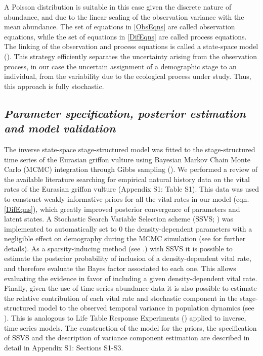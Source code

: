 \documentclass[12pt]{article}
\begin{document}
A Poisson distribution is suitable  in this case given the discrete nature of abundance, and due to the linear scaling of the observation variance with the mean abundance. The set of equations in \ref{ObsEqns} are called observation equations, while the set of equations in \ref{DifEqns} are called process equations. The linking of the observation and process equations is called a state-space model (\cite{King2010}). This strategy efficiently separates the uncertainty arising from the observation process, in our case the uncertain assignment of a demographic stage to an individual, from the variability due to the ecological process under study. Thus, this approach is fully stochastic.

\subsection*{\textit{Parameter specification, posterior estimation and model validation}}

The inverse state-space stage-structured model was fitted to the stage-structured time series of the Eurasian griffon vulture using Bayesian Markov Chain Monte Carlo (MCMC) integration through Gibbs sampling (\cite{Gelman2014}). We performed a review of the available literature searching for empirical natural history data on the vital rates of the Eurasian griffon vulture (Appendix S1: Table S1). This data was used to construct weakly informative priors for all the vital rates in our model (eqn. \ref{DifEqns}), which greatly improved posterior convergence of parameters and latent states. A Stochastic Search Variable Selection scheme (SSVS; \cite{George1993}) was implemented to automatically set to 0 the density-dependent parameters with a negligible effect on demography during the MCMC simulation (see \cite{Mutshinda2011,Almaraz2011} for further details). As a sparsity-inducing method (see \cite{Gelman2014}.) with SSVS it is possible to estimate the posterior probability of inclusion of a density-dependent vital rate, and therefore evaluate the Bayes factor associated to each one. This allows evaluating the evidence in favor of including a given density-dependent vital rate. Finally, given the use of time-series abundance data it is also possible to estimate the relative contribution of each vital rate and stochastic component in the stage-structured model to the observed temporal variance in population dynamics (see \cite{Almaraz2011,Mutshinda2011}). This is analogous to Life Table Response Experiments (\cite{Caswell2010}) applied to inverse, time series models. The construction of the model for the priors, the specification of SSVS and the description of variance component estimation are described in detail in Appendix S1: Sections S1-S3. \\
\end{document}
